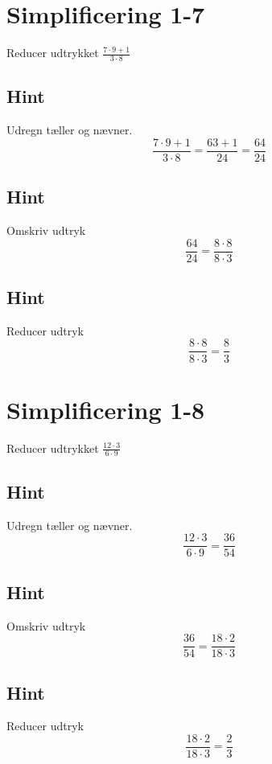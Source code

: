 \documentclass{article}
\newenvironment{exercise}[1]{\newpage\section{#1}}{}
\newcommand{\answerbox}[1]{\fbox{$#1$}}
\newcommand{\hint}{\subsection*{Hint}}
\begin{document}
\newpage

\begin{exercise}{Simplificering 1-7}
	
	Reducer udtrykket $\frac{7 \cdot 9 + 1}{3 \cdot 8}$
	
	\answerbox{\frac{8}{3}}
	
	\hint
	
	Udregn tæller og nævner.
	\[
	\frac{7 \cdot 9 + 1}{3 \cdot 8} = \frac{63+1}{24} = \frac{64}{24}
	\]
	
	\hint

	Omskriv udtryk 
	\[
	\frac{64}{24} = \frac{8 \cdot 8}{8 \cdot 3}
	\]	
	
	\hint
	
	Reducer udtryk 
	\[
	\frac{8 \cdot 8}{8 \cdot 3} = \frac{8}{3}
	\]
	
\end{exercise}

\newpage

\begin{exercise}{Simplificering 1-8}
	
	Reducer udtrykket $\frac{12 \cdot 3}{6 \cdot 9}$

	\answerbox{\frac{2}{3}}

	\hint

	Udregn tæller og nævner.
	\[
	\frac{12 \cdot 3}{6 \cdot 9} = \frac{36}{54}
	\]
	
	\hint

	Omskriv udtryk 
	\[
	\frac{36}{54} = \frac{18 \cdot 2}{18 \cdot 3} 
	\]

	\hint

	Reducer udtryk 
	\[
	 \frac{18 \cdot 2}{18 \cdot 3} = \frac{2}{3}
	\]
	
\end{exercise}
\end{document}
